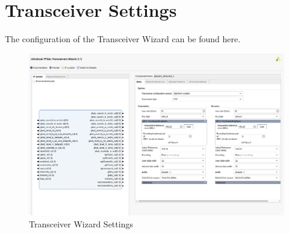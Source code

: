 \documentclass[oneside]{discothesis}
\begin{document}
\tableofcontents

\mainmatter %










\appendix
\chapter{Transceiver Settings}%
\label{cha:transceiver_settings}
The configuration of the Transceiver Wizard can be found here.

\begin{figure}[ht]
    \centering
    \hspace*{-2cm}\includegraphics[width=1.3\linewidth]{img/transceiver1.png}
    \caption{Transceiver Wizard Settings}%
    \label{fig:transceiver1}
\end{figure}

\cleardoublepage
\end{document}
